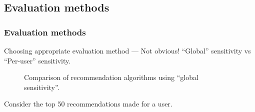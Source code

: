 \documentclass{beamer}
\begin{document}
\subsection{Evaluation methods}
\begin{frame}
\frametitle{Evaluation methods}
\begin{itemize}
\pitem Choosing appropriate evaluation method --- Not obvious!
\pitem ``Global'' sensitivity vs ``Per-user'' sensitivity.
\pause
\begin{figure}[h]
  \begin{center}
  \end{center}
  \caption{Comparison of recommendation algorithms using ``global sensitivity''.}
\end{figure}
\pitem Consider the top 50 recommendations made for a user.
\end{itemize}
\end{frame}
\end{document}
